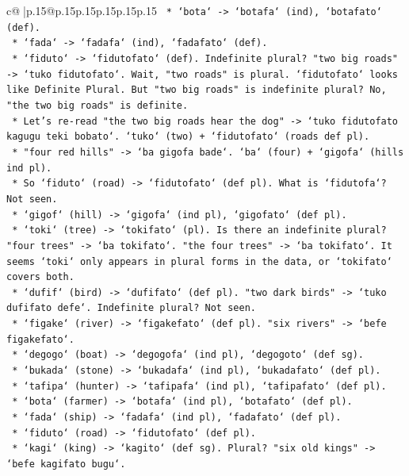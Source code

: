 \documentclass{article}
\begin{document}
{\begin{supertabular}{c@{$\;$}|p{.15\linewidth}@{}p{.15\linewidth}p{.15\linewidth}p{.15\linewidth}p{.15\linewidth}p{.15\linewidth}}
{{{\texttt{        *   `bota` {-}> `botafa` (ind), `botafato` (def).} \\
\texttt{        *   `fada` {-}> `fadafa` (ind), `fadafato` (def).} \\
\texttt{        *   `fiduto` {-}> `fidutofato` (def). Indefinite plural? "two big roads" {-}> `tuko fidutofato`. Wait, "two roads" is plural. `fidutofato` looks like Definite Plural. But "two big roads" is indefinite plural? No, "the two big roads" is definite.} \\
\texttt{        *   Let's re{-}read "the two big roads hear the dog" {-}> `tuko fidutofato kagugu teki bobato`. `tuko` (two) + `fidutofato` (roads def pl).} \\
\texttt{        *   "four red hills" {-}> `ba gigofa bade`. `ba` (four) + `gigofa` (hills ind pl).} \\
\texttt{        *   So `fiduto` (road) {-}> `fidutofato` (def pl). What is `fidutofa`? Not seen.} \\
\texttt{        *   `gigof` (hill) {-}> `gigofa` (ind pl), `gigofato` (def pl).} \\
\texttt{        *   `toki` (tree) {-}> `tokifato` (pl). Is there an indefinite plural? "four trees" {-}> `ba tokifato`. "the four trees" {-}> `ba tokifato`. It seems `toki` only appears in plural forms in the data, or `tokifato` covers both.} \\
\texttt{        *   `dufif` (bird) {-}> `dufifato` (def pl). "two dark birds" {-}> `tuko dufifato defe`. Indefinite plural? Not seen.} \\
\texttt{        *   `figake` (river) {-}> `figakefato` (def pl). "six rivers" {-}> `befe figakefato`.} \\
\texttt{        *   `degogo` (boat) {-}> `degogofa` (ind pl), `degogoto` (def sg).} \\
\texttt{        *   `bukada` (stone) {-}> `bukadafa` (ind pl), `bukadafato` (def pl).} \\
\texttt{        *   `tafipa` (hunter) {-}> `tafipafa` (ind pl), `tafipafato` (def pl).} \\
\texttt{        *   `bota` (farmer) {-}> `botafa` (ind pl), `botafato` (def pl).} \\
\texttt{        *   `fada` (ship) {-}> `fadafa` (ind pl), `fadafato` (def pl).} \\
\texttt{        *   `fiduto` (road) {-}> `fidutofato` (def pl).} \\
\texttt{        *   `kagi` (king) {-}> `kagito` (def sg). Plural? "six old kings" {-}> `befe kagifato bugu`.} \\
}}}
\end{supertabular}}
\end{document}
